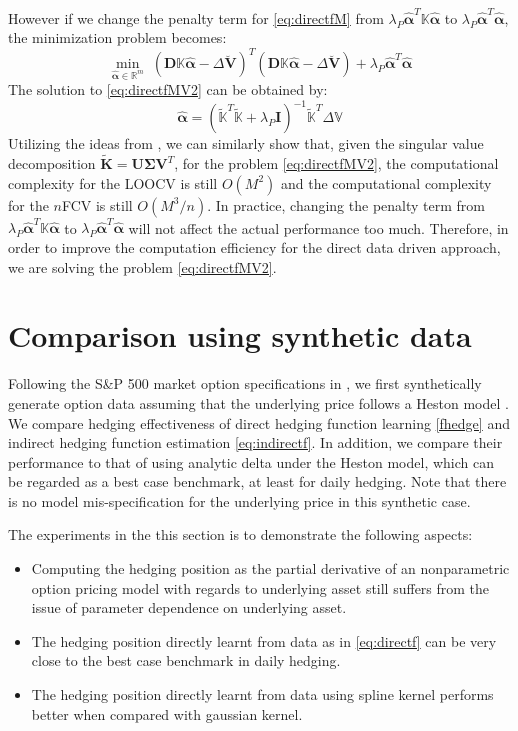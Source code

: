 \documentclass[letterpaper,12pt,titlepage,oneside,final]{book}
\numberwithin{equation}{section}
\theoremstyle{definition}
\newcommand{\Real}{\mathbb{R}}
\newcommand{\valpha}{\pmb{\widehat{\alpha}}}
\newcommand{\vK}{\mathbb{K}}
\newcommand{\vV}{\pmb{\breve{V}}}
\newcommand{\vecVmkt}{\mathbb{V}}
\begin{document}
However if we change the penalty term for \eqref{eq:directfM} from $\lambda_P \valpha^T\vK\valpha$ to $\lambda_P \valpha^T\valpha$, the minimization problem becomes:
\begin{equation}
\min_{\valpha \in \Real^m} \; ( \pmb{D} \vK \valpha - \Delta\vV)^T (\pmb{D}  \vK \valpha -\Delta\vV)+ \lambda_P \valpha^T\valpha
\label{eq:directfMV2}
\end{equation}
The solution to \eqref{eq:directfMV2} can be obtained by:
\[
\valpha = (\widetilde{\vK}^T\widetilde{\vK}  + \lambda_P \pmb{I})^{-1} \widetilde{\vK}^T \Delta \vecVmkt
\]
Utilizing the ideas from \cite{pahikkala2006fast, wahba1990spline}, we can similarly show that,  given the singular value decomposition $\pmb{\widetilde{K}}=\pmb{U} \pmb{\Sigma} \pmb{V}^T$, for the problem \eqref{eq:directfMV2},  the computational complexity for the LOOCV is still $O(M^2)$ and the computational complexity for the $n$FCV is still $O(M^3/n)$. In practice, changing the penalty term from $\lambda_P \valpha^T\vK\valpha$ to $\lambda_P \valpha^T\valpha$ will not affect the actual performance too much. Therefore, in order to improve the computation efficiency for the direct data driven approach, we are solving the problem \eqref{eq:directfMV2}.






\section{Comparison using synthetic data}\label{sec:Synexperiment}
Following the S\&P 500  market option specifications in \citep{hull2006options},  we first synthetically generate option data assuming that the underlying price follows a Heston model \citep{heston1993closed}.
We  compare hedging effectiveness of direct hedging function learning \eqref{fhedge}  and indirect hedging function estimation  \eqref{eq:indirectf}. In addition, we compare their performance to that of using  analytic delta under the  Heston model, which can be regarded as a best case benchmark, at least for daily hedging. Note that there is no model mis-specification  for the underlying price in this synthetic case.

The experiments in the this section is to demonstrate the following aspects:
\begin{itemize}
\item Computing the hedging position as the partial derivative of an nonparametric option pricing model with regards to underlying asset still suffers from the issue of parameter dependence on underlying asset.
\item The hedging position directly learnt from data as in \eqref{eq:directf} can be very close to the  best case benchmark in daily hedging.
\item The hedging position directly learnt from data using spline kernel performs better when compared with gaussian kernel.
\end{itemize}
\end{document}
